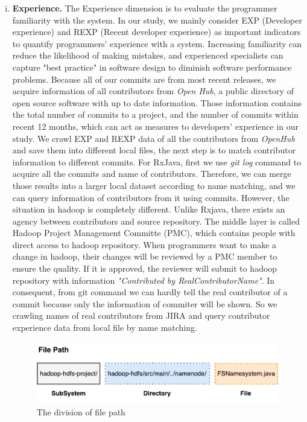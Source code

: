 \begin{enumerate}[(i)]
	\item \noindent
	\textbf{Experience.}
	The Experience dimension is to evaluate the programmer familiarity with the system. In our study, we mainly consider EXP (Developer experience) and REXP (Recent developer experience) as important indicators to quantify programmers' experience with a system. Increasing familiarity can reduce the likelihood of making mistakes\cite{mockus2000predicting}, and experienced specialists can capture "best practice" in software design to diminish software performance problems\cite{smith2003more}. Because all of our commits are from most recent releases, we acquire information of all contributors from  \textit{Open Hub}, a public directory of open source software with up to date information. Those information contains the total number of commits to a project, and the number of commits within recent 12 months, which can act as measures to developers' experience in our study. We crawl EXP and REXP data of all the contributors from \textit{OpenHub} and save them into different local files, the next step is to match contributor information to different commits. For RxJava, first we use \textit{git log} command to acquire all the commits and name of contributors. Therefore, we can merge those results into a larger local dataset according to name matching, and we can query information of contributors from it using commits. However, the situation in hadoop is completely different. Unlike Rxjava, there exists an agency between contributors and source repository. The middle layer is called Hadoop Project Management Committe (PMC), which contains people with direct access to hadoop repository. When programmers want to make a change in hadoop, their changes will be reviewed by a PMC member to ensure the quality. If it is approved, the reviewer will submit to hadoop repository with information \textit{"Contributed by RealContributorName"}. In consequent, from git command we can hardly tell the real contributor of a commit because only the information of commiter will be shown. So we crawling names of real contributors from JIRA and query contributor experience data from local file by name matching. 
	
	
	\begin{figure}
		\centering
		\includegraphics[width=\columnwidth]{Diffusion.pdf}
		\centering \caption{The division of file path}
		\label{fig:diffusion}
	\end{figure}
\end{enumerate}

